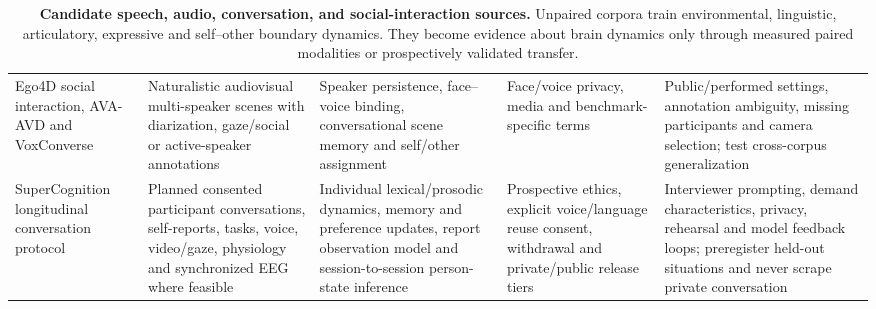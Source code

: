 \begin{table}[!h]
\begin{tabularx}{\textwidth}{@{}p{}p{}p{}p{}X@{}}
Ego4D social interaction, AVA-AVD and VoxConverse &
Naturalistic audiovisual multi-speaker scenes with diarization, gaze/social
or active-speaker annotations &
Speaker persistence, face--voice binding, conversational scene memory and
self/other assignment &
Face/voice privacy, media and benchmark-specific terms &
Public/performed settings, annotation ambiguity, missing participants and
camera selection; test cross-corpus generalization\\

SuperCognition longitudinal conversation protocol &
Planned consented participant conversations, self-reports, tasks, voice,
video/gaze, physiology and synchronized EEG where feasible &
Individual lexical/prosodic dynamics, memory and preference updates, report
observation model and session-to-session person-state inference &
Prospective ethics, explicit voice/language reuse consent, withdrawal and
private/public release tiers &
Interviewer prompting, demand characteristics, privacy, rehearsal and model
feedback loops; preregister held-out situations and never scrape private
conversation\\
\bottomrule
\end{tabularx}
\caption{\textbf{Candidate speech, audio, conversation, and social-interaction
sources.} Unpaired corpora train environmental, linguistic, articulatory,
expressive and self--other boundary dynamics. They become evidence about brain
dynamics only through measured paired modalities or prospectively validated
transfer.}
\label{tab:appendix-conversation}
\end{table}

